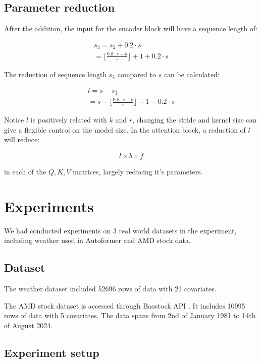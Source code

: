 \documentclass[stu,12pt,floatsintext]{apa7}
\begin{document}
\subsection{Parameter reduction}

After the addition, the input for the encoder block will have a sequence length of:

\begin{gather}
    s_3=s_2+0.2\cdot s\\
    =\lfloor\frac{0.8\cdot s-k}{r} \rfloor+1+0.2\cdot s
\end{gather}

The reduction of sequence length $s_3$ compared to $s$ can be calculated:

\begin{gather}
    l=s-s_3\\
    =s-\lfloor\frac{0.8\cdot s-k}{r} \rfloor-1-0.2\cdot s
\end{gather}

Notice $l$ is positively related with $k$ and $r$, changing the stride and kernel size can give a flexible control on the model size. In the attention block, a reduction of $l$ will reduce:

\begin{gather}
    l\times b\times f
\end{gather}

in each of the $Q,K,V$ matrices, largely reducing it's parameters.

\section{Experiments}

We had conducted experiments on 3 real world datasets in the experiment, including weather used in Autoformer \parencite{autoformer} and AMD stock data. 

\subsection{Dataset}

The weather dataset included 52696 rows of data with 21 covariates. 

The AMD stock dataset is accessed through Baostock API \parencite{baostock}. It includes 10995 rows of data with 5 covariates. The data spans from 2nd of January 1981 to 14th of August 2024. 

\subsection{Experiment setup}
\end{document}

